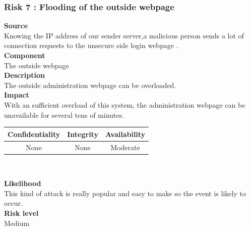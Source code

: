 \documentclass[a4paper,11pt]{article}
\begin{document}
\subsubsection{Risk 7 : Flooding of the outside webpage}
\textbf{Source} \\Knowing the IP address of our sender server,a malicious person sends a lot of connection requests to the unsecure side login webpage . \\
\textbf{Component} \\The outside webpage\\
\textbf{Description}\\ The outside administration webpage can be overloaded. \\
\textbf{Impact}\\
With an sufficient overload of this system, the administration webpage can be unavailable for several tens of minutes.\\
\begin{center}
\begin{tabular}{|c|c|c|}
\hline
\textbf{Confidentiality} & \textbf{Integrity} & \textbf{Availability} \\
\hline
None & None & Moderate \\
\hline
\end{tabular}\\
\end{center}
\textbf{Likelihood}\\ This kind of attack is really popular and easy to make so the event is likely to occur.\\
\textbf{Risk level}\\Medium\\
\end{document}
